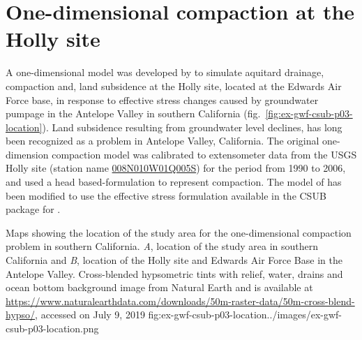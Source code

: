 \section{One-dimensional compaction at the Holly site}

A one-dimensional \mf model was developed by \cite{sneed2008} to simulate aquitard drainage, compaction and, land subsidence at the Holly site, located at the Edwards Air Force base, in response to effective stress changes caused by groundwater pumpage in the Antelope Valley in southern California (fig.~\ref{fig:ex-gwf-csub-p03-location}). Land subsidence resulting from groundwater level declines, has long been recognized as a problem in Antelope Valley, California. The original one-dimension compaction model was calibrated to extensometer data from the USGS Holly site (station name \href{https://waterdata.usgs.gov/ca/nwis/dv/?site_no=344835117531305}{008N010W01Q005S}) for the period from 1990 to 2006, and used a head based-formulation to represent compaction. The model of \cite{sneed2008} has been modified to use the effective stress formulation available in the CSUB package for \mf.

\begin{StandardFigure}{
                                     Maps showing the location of the study area for the one-dimensional 
                                     compaction problem in southern California. \textit{A}, location of the 
                                     study area in southern California and \textit{B}, location of the Holly site and
                                     Edwards Air Force Base in the Antelope Valley. Cross-blended hypsometric 
                                     tints with relief, water, drains and ocean bottom background image from 
                                     Natural Earth and is available at 
                                     \url{https://www.naturalearthdata.com/downloads/50m-raster-data/50m-cross-blend-hypso/}, 
                                     accessed on July 9, 2019 
                                     }{fig:ex-gwf-csub-p03-location}{../images/ex-gwf-csub-p03-location.png}
\end{StandardFigure}                                 

